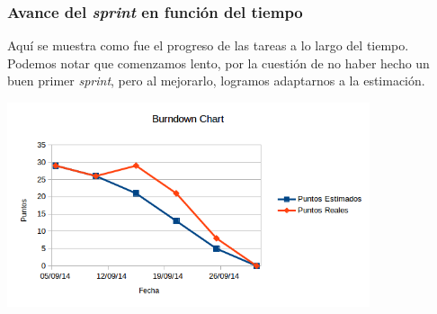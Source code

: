   \subsubsection{Avance del \textit{sprint} en funci\'on del tiempo}
  Aqu\'i se muestra como fue el progreso de las tareas a lo largo
  del tiempo. Podemos notar que comenzamos lento, por la cuesti\'on
  de no haber hecho un buen primer \textit{sprint}, pero al mejorarlo,
  logramos adaptarnos a la estimaci\'on.

  \vspace{1cm}

    \includegraphics[width=0.8\textwidth]{img/burndownchart.png}
